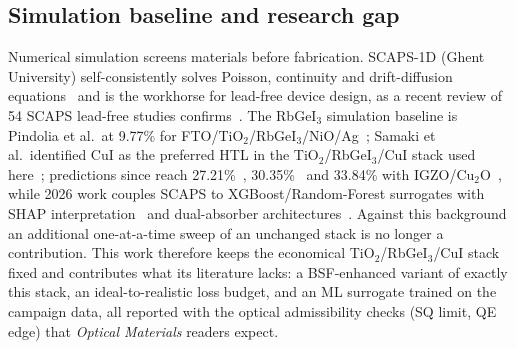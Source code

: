 \documentclass[review]{elsarticle}
\begin{document}
\subsection{Simulation baseline and research gap}
Numerical simulation screens materials before fabrication. SCAPS-1D (Ghent University) self-consistently solves Poisson, continuity and drift-diffusion equations~\cite{r19,r20,r21} and is the workhorse for lead-free device design, as a recent review of 54 SCAPS lead-free studies confirms~\cite{rReview}. The RbGeI$_{3}$ simulation baseline is Pindolia et al.\ at 9.77\% for FTO/TiO$_{2}$/RbGeI$_{3}$/NiO/Ag~\cite{r14}; Samaki et al.\ identified CuI as the preferred HTL in the TiO$_{2}$/RbGeI$_{3}$/CuI stack used here~\cite{r13}; predictions since reach 27.21\%~\cite{r22}, 30.35\%~\cite{rRahman} and 33.84\% with IGZO/Cu$_{2}$O~\cite{rReza}, while 2026 work couples SCAPS to XGBoost/Random-Forest surrogates with SHAP interpretation~\cite{rJCE,rMA,rML40} and dual-absorber architectures~\cite{rDual,rHasnain}. Against this background an additional one-at-a-time sweep of an unchanged stack is no longer a contribution. This work therefore keeps the economical TiO$_{2}$/RbGeI$_{3}$/CuI stack fixed and contributes what its literature lacks: a BSF-enhanced variant of exactly this stack, an ideal-to-realistic loss budget, and an ML surrogate trained on the campaign data, all reported with the optical admissibility checks (SQ limit, QE edge) that \textit{Optical Materials} readers expect.
\end{document}
